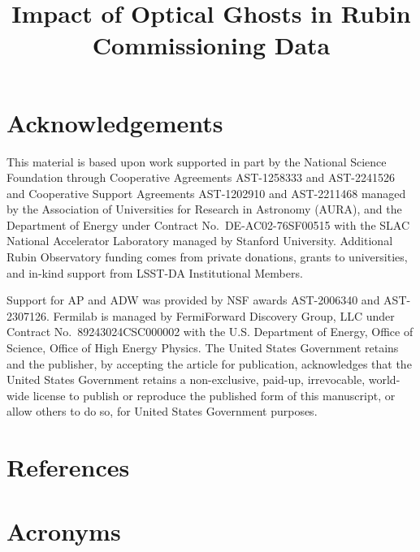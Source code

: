 \documentclass[SE,authoryear,toc]{lsstdoc}
\title{Impact of Optical Ghosts in Rubin Commissioning Data}
\date{\vcsDate}
\begin{document}
\maketitle






\appendix

\section{Acknowledgements}

This material is based upon work supported in part by the National Science Foundation through Cooperative Agreements AST-1258333 and AST-2241526 and Cooperative Support Agreements AST-1202910 and AST-2211468 managed by the Association of Universities for Research in Astronomy (AURA), and the Department of Energy under Contract No.\ DE-AC02-76SF00515 with the SLAC National Accelerator Laboratory managed by Stanford University.
Additional Rubin Observatory funding comes from private donations, grants to universities, and in-kind support from LSST-DA Institutional Members.

Support for AP and ADW was provided by NSF awards AST-2006340 and AST-2307126.
Fermilab is managed by FermiForward Discovery Group, LLC under Contract No.\ 89243024CSC000002 with the U.S. Department of Energy, Office of Science, Office of High Energy Physics. The United States Government retains and the publisher, by accepting the article for publication, acknowledges that the United States Government retains a non-exclusive, paid-up, irrevocable, world-wide license to publish or reproduce the published form of this manuscript, or allow others to do so, for United States Government purposes.

\section{References} \label{sec:bib}
\renewcommand{\refname}{} %


\section{Acronyms} \label{sec:acronyms}

\clearpage

\end{document}
